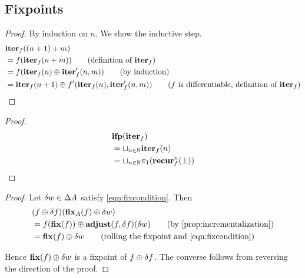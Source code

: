 \subsection{Fixpoints}

\iterDerivativesN*
\begin{proof}
  \label{prf:iterDerivativesN}
  By induction on $n$. We show the inductive step.
  \begin{align*}
    &\iter_f((n+1) + m)\\
    &=f(\iter_f(n + m)) \tag{definition of $\iter_f$}\\
    &=f(\iter_f(n) \cplus \derive{\iter_f}(n, m)) \tag{by induction}\\
    &=\iter_f(n+1) \cplus \derive{f}(\iter_f(n), \derive{\iter_f}(n, m)) \tag{$f$ is differentiable, definition of $\iter_f$}
  \end{align*}
\end{proof}

\fixpointIter*
\begin{proof}
  \label{prf:fixpointIter}
  \begin{align*}
    &\mathbf{lfp}(\mathbf{iter}_f)\\
    &=\sqcup_{n \in \mathbb{N}} \mathbf{iter}_f(n)\\
    &=\sqcup_{n \in \mathbb{N}} \pi_1 (\mathbf{recur}_f^n(\bot))
  \end{align*}
\end{proof}

\fixpointPseudoDerivatives*
\begin{proof}
  \label{prf:fixpointPseudoDerivatives}
  Let $\delta w \in \Delta A$ satisfy \cref{eqn:fixcondition}. Then
  \begin{align*}
    &(f \cplus \change{f})(\fixpoint_A(f) \cplus \change{w})\\
    &= f(\fixpoint(f))
    \cplus
    \adjust(f, \change{f})(\change{w})
    \tag{by \cref{prop:incrementalization}}\\
    &= \fixpoint(f)
    \cplus
    \change{w}
    \tag{rolling the fixpoint and \cref{eqn:fixcondition}}
  \end{align*}

  Hence $\mathbf{fix}(f) \oplus \delta w$ is a fixpoint of $f \oplus \delta f$. The converse
  follows from reversing the direction of the proof.
\end{proof}

